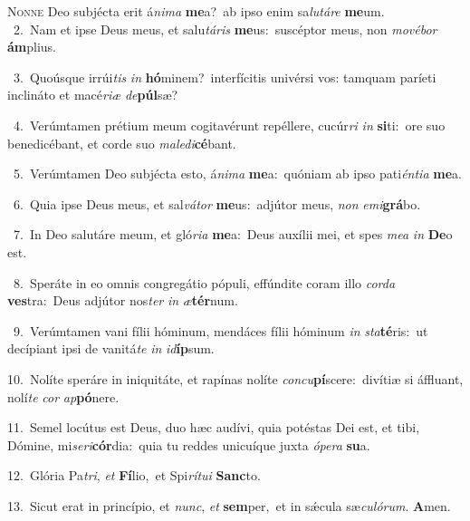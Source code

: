 \lettrine{\initial\textcolor{\initialcolor}{N}}{onne} Deo subjécta erit á\-\textit{ni}\-\textit{ma} \textbf{me}\-a?~\star ab ipso enim sa\-\textit{lu}\-\textit{tá}\textit{re} \textbf{me}\-um.\\
{\numbfont\textcolor{\numbcolor}{~2.}}~Nam et ipse Deus meus, et salu\-\textit{tá}\-\textit{ris} \textbf{me}\-us:~\star suscéptor meus, non \textit{mo}\-\textit{vé}\textit{bor} \textbf{ám}\-plius.\par
{\numbfont\textcolor{\numbcolor}{~3.}}~Quoúsque irrúi\textit{tis} \textit{in} \textbf{hó}\-minem?~\star interfícitis univérsi vos: tamquam paríeti inclináto et macé\-\textit{ri}\-\textit{æ} \textit{de}\-\textbf{púl}sæ?\par
{\numbfont\textcolor{\numbcolor}{~4.}}~Verúmtamen prétium meum cogitavérunt repéllere, cucúr\textit{ri} \textit{in} \textbf{si}\-ti:~\star ore suo benedicébant, et corde suo \textit{ma}\-\textit{le}\textit{di}\textbf{cé}bant.\par
{\numbfont\textcolor{\numbcolor}{~5.}}~Verúmtamen Deo subjécta esto, á\-\textit{ni}\-\textit{ma} \textbf{me}\-a:~\star quóniam ab ipso pati\-\textit{én}\-\textit{ti}\textit{a} \textbf{me}\-a.\par
{\numbfont\textcolor{\numbcolor}{~6.}}~Quia ipse Deus meus, et sal\-\textit{vá}\-\textit{tor} \textbf{me}\-us:~\star adjútor meus, \textit{non} \textit{e}\-\textit{mi}\textbf{grá}bo.\par
{\numbfont\textcolor{\numbcolor}{~7.}}~In Deo salutáre meum, et gló\-\textit{ri}\-\textit{a} \textbf{me}\-a:~\star Deus auxílii mei, et spes \textit{me}\-\textit{a} \textit{in} \textbf{De}\-o est.\par
{\numbfont\textcolor{\numbcolor}{~8.}}~Speráte in eo omnis congregátio pópuli, effúndite coram illo \textit{cor}\-\textit{da} \textbf{ves}\-tra:~\star Deus adjútor nos\textit{ter} \textit{in} \textit{æ}\-\textbf{tér}num.\par
{\numbfont\textcolor{\numbcolor}{~9.}}~Verúmtamen vani fílii hóminum, mendáces fílii hóminum \textit{in} \textit{sta}\-\textbf{té}ris:~\star ut decípiant ipsi de vanitá\textit{te} \textit{in} \textit{id}\-\textbf{íp}sum.\par
{\numbfont\textcolor{\numbcolor}{10.}}~Nolíte speráre in iniquitáte, et rapínas nolíte \textit{con}\-\textit{cu}\textbf{pí}scere:~\star divítiæ si áffluant, nolí\textit{te} \textit{cor} \textit{ap}\-\textbf{pó}nere.\par
{\numbfont\textcolor{\numbcolor}{11.}}~Semel locútus est Deus, duo hæc audívi, quia potéstas Dei est, et tibi, Dómine, mi\-\textit{se}\-\textit{ri}\textbf{cór}dia:~\star quia tu reddes unicuíque juxta \textit{ó}\-\textit{pe}\textit{ra} \textbf{su}\-a.\par
{\numbfont\textcolor{\numbcolor}{12.}}~Glória Pa\-\textit{tri}\-, \textit{et} \textbf{Fí}\-lio,~\star et Spi\-\textit{rí}\-\textit{tu}\textit{i} \textbf{Sanc}\-to.\par
{\numbfont\textcolor{\numbcolor}{13.}}~Sicut erat in princípio, et \textit{nunc}\-, \textit{et} \textbf{sem}\-per,~\star et in sǽcula sæ\-\textit{cu}\-\textit{ló}\textit{rum}. \textbf{A}\-men.\par
